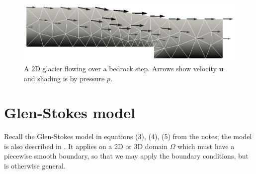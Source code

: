\documentclass[letterpaper,final,12pt,reqno]{amsart}
\newcommand{\bu}{\mathbf{u}}
\begin{document}
\begin{figure}[h]
\includegraphics[width=\textwidth,angle=-5.7296]{stepflowlin}  %
\caption{A 2D glacier flowing over a bedrock step.  Arrows show velocity $\bu$ and shading is by pressure $p$.}
\label{fig:glacier}
\end{figure}


\section{Glen-Stokes model} \label{sec:stokes}

Recall the Glen-Stokes model in equations (3), (4), (5) from the notes; the model is also described in \cite{GreveBlatter2009,JouvetRappaz2011}.  It applies on a 2D or 3D domain $\Omega$ which must have a piecewise smooth boundary, so that we may apply the boundary conditions, but is otherwise general.
\end{document}
